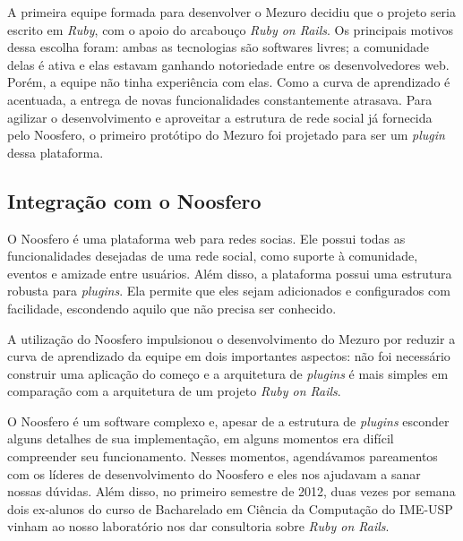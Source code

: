 \documentclass{llncs}
\begin{document}
A primeira equipe formada para desenvolver o Mezuro decidiu que o projeto seria escrito em \textit{Ruby}, com o apoio do arcabouço \textit{Ruby on Rails}. Os principais motivos dessa escolha foram: ambas as tecnologias são softwares livres; a comunidade delas é ativa e elas estavam ganhando notoriedade entre os desenvolvedores web. Porém, a equipe não tinha experiência com elas. Como a curva de aprendizado é acentuada, a entrega de novas funcionalidades constantemente atrasava. Para agilizar o desenvolvimento e aproveitar a estrutura de rede social já fornecida pelo Noosfero, o primeiro protótipo do Mezuro foi projetado para ser um \textit{plugin} dessa plataforma.

\subsection{Integração com o Noosfero}\label{sec:noosfero}

O Noosfero é uma plataforma web para redes socias. Ele possui todas as funcionalidades desejadas de uma rede social, como suporte à comunidade, eventos e amizade entre usuários. Além disso, a plataforma possui uma estrutura robusta para \textit{plugins}. Ela permite que eles sejam adicionados e configurados com facilidade, escondendo aquilo que não precisa ser conhecido.

A utilização do Noosfero impulsionou o desenvolvimento do Mezuro por reduzir a curva de aprendizado da equipe em dois importantes aspectos: não foi necessário construir uma aplicação do começo e a arquitetura de \textit{plugins} é mais simples em comparação com a arquitetura de um projeto \textit{Ruby on Rails}.

O Noosfero é um software complexo e, apesar de a estrutura de \textit{plugins} esconder alguns detalhes de sua implementação, em alguns momentos era difícil compreender seu funcionamento. Nesses momentos, agendávamos pareamentos com os líderes de desenvolvimento do Noosfero e eles nos ajudavam a sanar nossas dúvidas. Além disso, no primeiro semestre de 2012, duas vezes por semana dois ex-alunos do curso de Bacharelado em Ciência da Computação do IME-USP vinham ao nosso laboratório nos dar consultoria sobre \textit{Ruby on Rails}.
\end{document}
